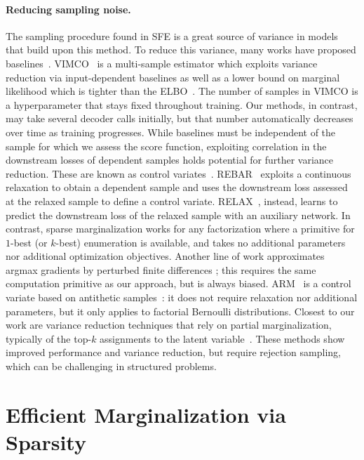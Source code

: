 \paragraph*{Reducing sampling noise.} The sampling procedure found in
SFE is a great source of variance in models that build upon this
method. To reduce this variance, many works have proposed
baselines~\citep{Williams1992,MuProp,CV2013}. VIMCO~\citep{VIMCO} is
a multi-sample estimator which exploits variance reduction via
input-dependent baselines as well as a lower bound on marginal
likelihood which is tighter than the ELBO~\citep{IWAE}. The number of
samples in VIMCO is a hyperparameter that stays fixed throughout
training. Our methods, in contrast, may take several decoder calls
initially, but that number automatically decreases over time as
training progresses. While baselines must be independent of the
sample for which we assess the score function, exploiting correlation
in the downstream losses of dependent samples holds potential for
further variance reduction. These are known as control
variates~\citep{GreensmithEtAl}. REBAR~\citep{REBAR} exploits a
continuous relaxation to obtain a dependent sample and uses the
downstream loss assessed at the relaxed sample to define a control
variate. RELAX~\citep{RELAX}, instead, learns to predict the
downstream loss of the relaxed sample with an auxiliary network. In
contrast, sparse marginalization works for any factorization where a
primitive for $1$-best (or $k$-best) enumeration is available, and
takes no additional parameters nor additional optimization
objectives. Another line of work approximates argmax gradients by
perturbed finite differences \cite{lorberbom2019direct,vlastelica};
this requires the same computation primitive as our approach, but is
always biased. ARM~\citep{yin2019arm} is a control variate based on
antithetic samples~\citep{mcbook}: it does not require relaxation nor
additional parameters, but it only applies to factorial Bernoulli
distributions. Closest to our work are variance reduction techniques
that rely on partial marginalization, typically of the top-$k$
assignments to the latent variable~\citep{RB19,Kool2020Estimating}.
These methods show improved performance and variance reduction, but
require rejection sampling, which can be challenging in structured
problems.

\section{Efficient Marginalization via Sparsity}
\label{sec:categorical}

